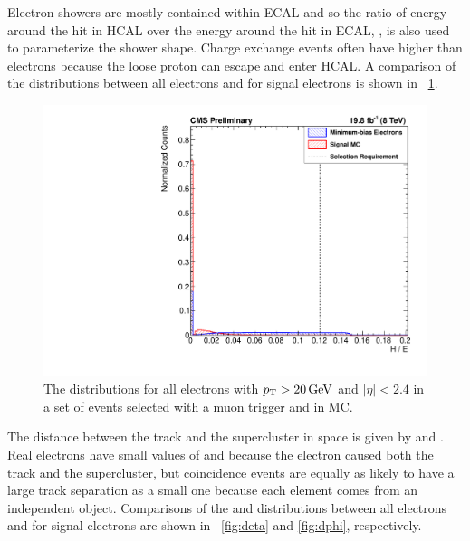 Electron showers are mostly contained within ECAL and so the ratio of energy
around the hit in HCAL over the energy around the hit in ECAL, \HOverE, is also
used to parameterize the shower shape. Charge exchange events often have higher
\HOverE than electrons because the loose proton can escape and enter HCAL. A
comparison of the \HOverE distributions between all electrons and for signal
electrons is shown in \FIG~\ref{fig:he}.

\begin{figure}[!htbp]
    \centering
    \includegraphics[width=\StackedPlotWidth]{figures/e_reco_var_he.pdf}
    \caption[
        Distributions of \HOverE in data and MC.
    ]{
        The \HOverE distributions for all electrons with $p_{\mathrm{T}} > 20 \,\text{Ge\hspace{-.08em}V}$ and
        $|\eta| < 2.4$ in a set of events selected with a muon trigger and in
        \MADGRAPH \Ztoee MC.
    }
    \label{fig:he}
\end{figure}

The distance between the track and the supercluster in \coordetaphi space is
given by \dphiin and \detain. Real electrons have small values of \dphiin and
\detain because the electron caused both the track and the supercluster, but
coincidence events are equally as likely to have a large track separation as a
small one because each element comes from an independent object. Comparisons of
the \dphiin and \detain distributions between all electrons and for signal
electrons are shown in \FIGS~\ref{fig:deta} and \ref{fig:dphi}, respectively.


